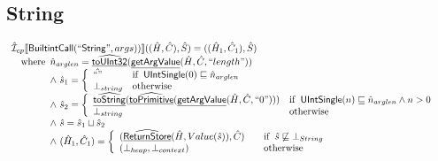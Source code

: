 \documentclass{article}
\newcommand{\SF}[1]{\mbox{\textsf{#1}}}
\newcommand{\wherec}[1]{{\rm where}\begin{array}[t]{l}#1\end{array}}
\newcommand{\ifc}[1]{{\rm if}\begin{array}[t]{l}#1\end{array}}
\newcommand{\owc}{{\rm otherwise}}
\newcommand{\aI}{\hat{\mathcal{I}}}
\newcommand{\lbr}{\llbracket}
\newcommand{\rbr}{\rrbracket}
\newcommand{\hf}[1]{\underline{\sf #1}}
\newcommand{\ahf}[1]{\widehat{\underline{\sf #1}}}
\begin{document}
\subsection{String}
\[
\begin{array}{l}
\aI _{cp}\lbr \SF{BuiltintCall}(``\SF{String}",args))\rbr((\hat{H},\hat{C}), \hat{S})
  = ((\hat{H}_1, \hat{C}_1), \hat{S})\\
\quad\wherec{
  \hat{n}_{arglen} = \ahf{toUInt32}(\hf{getArgValue}(\hat{H}, \hat{C}, ``length"))\\
   \land\ \hat{s}_1 = \left\{\begin{array}{ll}
       \hat{``"}
       & \ifc{\SF{UIntSingle}(0) \sqsubseteq \hat{n}_{arglen}}\\
     \bot_{string}& \owc
     \end{array}\right.\\
  \land\ \hat{s}_2 = \left\{\begin{array}{ll}
       \ahf{toString}(\ahf{toPrimitive}(\hf{getArgValue}(\hat{H}, \hat{C}, ``0")))
       & \ifc{\SF{UIntSingle}(n) \sqsubseteq \hat{n}_{arglen} \land n > 0}\\
     \bot_{string}& \owc
     \end{array}\right.\\
  \land\ \hat{s} = \hat{s}_1 \sqcup \hat{s}_2\\
  \land\ (\hat{H}_1, \hat{C}_1) = 
    \left\{\begin{array}{l@{\quad\quad}l}
      (\ahf{ReturnStore}(\hat{H}, Value(\hat{s})), \hat{C})
      & \ifc{\hat{s} \not\sqsubseteq \bot_{String}}\\
      (\bot_{heap}, \bot_{context}) & \owc \\
    \end{array}\right.\\
  }\\
\\\\



\end{array}\]
\end{document}
